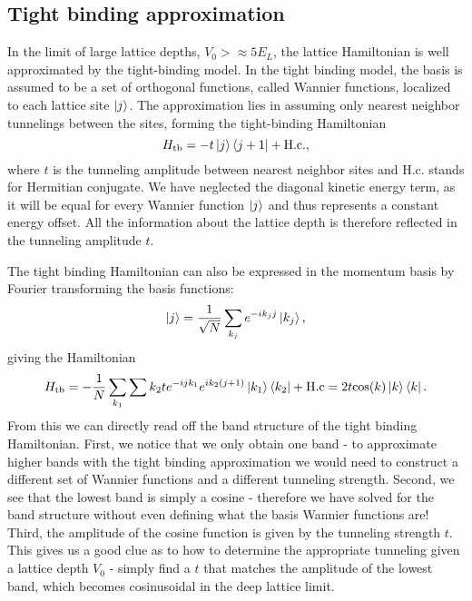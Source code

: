 \subsection{Tight binding approximation}

In the limit of large lattice depths, $V_0 > \approx 5 E_L$, the lattice Hamiltonian is well approximated by the tight-binding model. In the tight binding model, the basis is assumed to be a set of orthogonal functions, called Wannier functions, localized to each lattice site $\mathinner{|{j}\rangle}$.  The approximation lies in assuming only nearest neighbor tunnelings between the sites, forming the tight-binding Hamiltonian
\begin{equation}
H_{\rm tb} = - t \mathinner{|{j}\rangle}\mathinner{\langle{j+1}|} + {\rm H.c.},
\end{equation}
where $t$ is the tunneling amplitude between nearest neighbor sites and H.c. stands for Hermitian conjugate. We have neglected the diagonal kinetic energy term, as it will be equal for every Wannier function $\mathinner{|{j}\rangle}$ and thus represents a constant energy offset. All the information about the lattice depth is therefore reflected in the tunneling amplitude $t$. 

The tight binding Hamiltonian can also be expressed in the momentum basis by Fourier transforming the basis functions:
\begin{equation}
\mathinner{|{j}\rangle} = \frac{1}{\sqrt{N}}\sum_{k_j} e^{-i k_j j}\mathinner{|{k_j}\rangle},
\end{equation}
giving the Hamiltonian
\begin{equation}
H_{\rm tb} = - \frac{1}{N}\sum_{k_1}\sum{k_2} t e^{-i j k_1} e^{i k_2 (j+1)} \mathinner{|{k_1}\rangle}\mathinner{\langle{k_2}|} + {\rm H.c} = 2 t {\rm cos}(k)\mathinner{|{k}\rangle}\mathinner{\langle{k}|}.
\end{equation}  
From this we can directly read off the band structure of the tight binding Hamiltonian. First, we notice that we only obtain one band - to approximate higher bands with the tight binding approximation we would need to construct a different set of Wannier functions and a different tunneling strength. Second, we see that the lowest band is simply a cosine - therefore we have solved for the band structure without even defining what the basis Wannier functions are! Third, the amplitude of the cosine function is given by the tunneling strength $t$. This gives us a good clue as to how to determine the appropriate tunneling given a lattice depth $V_0$ - simply find a $t$ that matches the amplitude of the lowest band, which becomes cosinusoidal in the deep lattice limit. 

